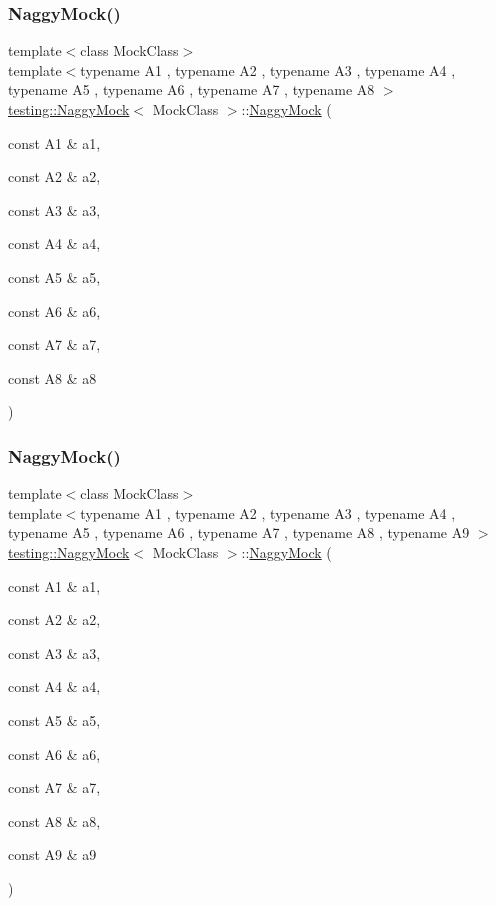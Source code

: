 \subsubsection{\texorpdfstring{Naggy\+Mock()}{NaggyMock()}\hspace{0.1cm}{\footnotesize\ttfamily [9/11]}}
{\footnotesize\ttfamily template$<$class Mock\+Class$>$ \\
template$<$typename A1 , typename A2 , typename A3 , typename A4 , typename A5 , typename A6 , typename A7 , typename A8 $>$ \\
\hyperlink{classtesting_1_1_naggy_mock}{testing\+::\+Naggy\+Mock}$<$ Mock\+Class $>$\+::\hyperlink{classtesting_1_1_naggy_mock}{Naggy\+Mock} (\begin{DoxyParamCaption}\item[{const A1 \&}]{a1,  }\item[{const A2 \&}]{a2,  }\item[{const A3 \&}]{a3,  }\item[{const A4 \&}]{a4,  }\item[{const A5 \&}]{a5,  }\item[{const A6 \&}]{a6,  }\item[{const A7 \&}]{a7,  }\item[{const A8 \&}]{a8 }\end{DoxyParamCaption})\hspace{0.3cm}{\ttfamily [inline]}}

\mbox{\label{classtesting_1_1_naggy_mock_a786f31ade7b8b9f6e78e07f51cc0e14b}} 
\subsubsection{\texorpdfstring{Naggy\+Mock()}{NaggyMock()}\hspace{0.1cm}{\footnotesize\ttfamily [10/11]}}
{\footnotesize\ttfamily template$<$class Mock\+Class$>$ \\
template$<$typename A1 , typename A2 , typename A3 , typename A4 , typename A5 , typename A6 , typename A7 , typename A8 , typename A9 $>$ \\
\hyperlink{classtesting_1_1_naggy_mock}{testing\+::\+Naggy\+Mock}$<$ Mock\+Class $>$\+::\hyperlink{classtesting_1_1_naggy_mock}{Naggy\+Mock} (\begin{DoxyParamCaption}\item[{const A1 \&}]{a1,  }\item[{const A2 \&}]{a2,  }\item[{const A3 \&}]{a3,  }\item[{const A4 \&}]{a4,  }\item[{const A5 \&}]{a5,  }\item[{const A6 \&}]{a6,  }\item[{const A7 \&}]{a7,  }\item[{const A8 \&}]{a8,  }\item[{const A9 \&}]{a9 }\end{DoxyParamCaption})\hspace{0.3cm}{\ttfamily [inline]}}

